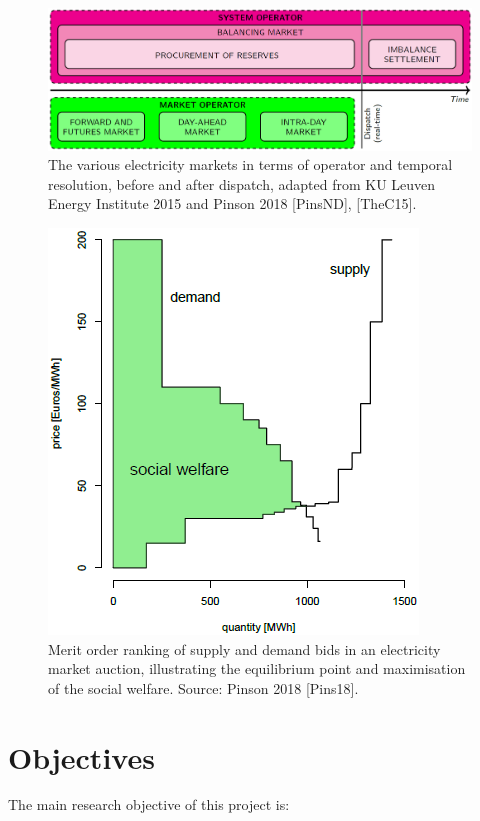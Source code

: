 \begin{figure}
\centering
\includegraphics{images/market-resolution.png}
\caption{The various electricity markets in terms of operator and
temporal resolution, before and after dispatch, adapted from KU Leuven
Energy Institute 2015 and Pinson 2018 {[}PinsND{]}, {[}TheC15{]}.}
\end{figure}

\begin{figure}
\centering
\includegraphics{images/merit-order.png}
\caption{Merit order ranking of supply and demand bids in an electricity
market auction, illustrating the equilibrium point and maximisation of
the social welfare. Source: Pinson 2018 {[}Pins18{]}.}
\end{figure}

\hypertarget{objectives}{%
\section{Objectives}\label{objectives}}

The main research objective of this project is:

